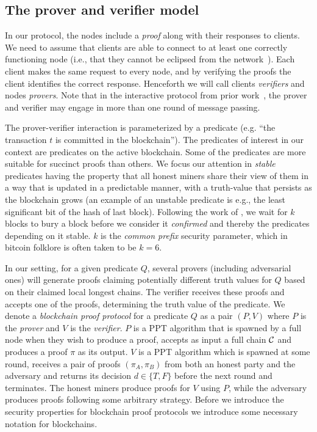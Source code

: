 \subsection{The prover and verifier model}
In our protocol, the nodes include a \emph{proof} along with their responses to clients.
We need to assume that clients are able to connect to at least one correctly functioning node (i.e., that they cannot be eclipsed from the network~\cite{heilman2015eclipse,hijackingbitcoin}).
Each client makes the same request to every node, and by verifying the proofs the client identifies the correct response.
Henceforth we will call clients \textit{verifiers} and nodes \textit{provers}.
Note that in the interactive protocol from prior work~\cite{KLS},  the prover and verifier may engage in more than one round of message passing.

The prover-verifier interaction is parameterized by a predicate (e.g. ``the transaction $t$ is committed in the blockchain'').
%
The predicates of interest in our context are predicates on the active
blockchain. Some of the predicates are more suitable for succinct proofs than
others. We focus our attention in \textit{stable} predicates having the property
that all honest miners share their view of them in a way that is updated in a
predictable manner, with a truth-value that persists as the blockchain grows (an
example of an unstable predicate is e.g., the least significant bit of the hash
of last block). Following the work of \cite{backbone}, we wait for $k$ blocks to
bury a block before we consider it \textit{confirmed} and thereby the predicates
depending on it stable. $k$ is the \textit{common prefix} security parameter,
which in bitcoin folklore is often taken to be $k = 6$.

In our setting, for a given predicate $Q$, several  provers (including
adversarial ones) will generate proofs claiming potentially different truth
values for $Q$ based on their claimed local longest chains. The verifier
receives these proofs and accepts one of the proofs, determining the truth value
of the predicate.  We denote a  \textit{blockchain proof protocol} for a
predicate $Q$ as a pair $(P, V)$ where $P$ is the \textit{prover} and $V$ is the
\textit{verifier}. $P$ is a PPT algorithm that is spawned by a full node when
they wish to produce a proof, accepts as input a full chain $\mathcal{C}$ and
produces a proof $\pi$ as its output. $V$ is a PPT algorithm which is spawned at
some round, receives a pair of proofs $(\pi_A, \pi_B)$ from both an honest party
and the adversary and returns its decision $d \in \{T, F\}$ before the
next round and terminates. The honest miners produce proofs for $V$ using $P$,
while the adversary produces proofs following some arbitrary strategy. Before we
introduce the security properties for blockchain proof protocols we introduce
some necessary notation for blockchains.

